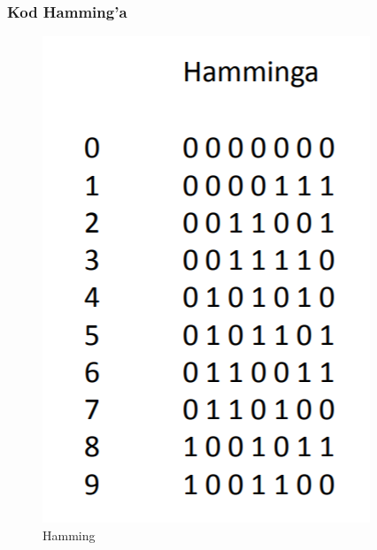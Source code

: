 \newpage

\subsubsection{Kod Hamming'a}

\begin{figure}[h!]
    \centering
    \includegraphics[width=.4\textwidth]{images/codes/hamming.png}
    \caption{Hamming}
    \label{fig:my_label}
\end{figure}